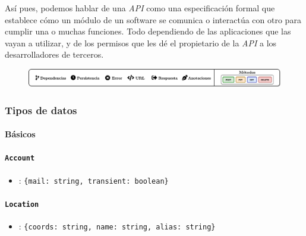 \documentclass[../ei103948-project-documentation.tex]{subfiles}
\begin{document}
Así pues, podemos hablar de una \textit{API} como una especificación formal que establece cómo un módulo de un software se comunica o interactúa con otro para cumplir una o muchas funciones. Todo dependiendo de las aplicaciones que las vayan a utilizar, y de los permisos que les dé el propietario de la \textit{API} a los desarrolladores de terceros.\\

\begin{figure}[H]
    \begin{center}
    \includegraphics[scale=0.083]{images/BannerAPI.png}
    \end{center}
\end{figure}


        \subsubsection{Tipos de datos}
            \paragraph{Básicos}
                \paragraph*{\texttt{Account}}
                    \begin{itemize}
                        \item [\faIcon{sign-out-alt}] : \texttt{\{mail: string, transient: boolean\}}
                    \end{itemize}
                \paragraph*{\texttt{Location}}
                    \begin{itemize}
                        \item [\faIcon{sign-out-alt}] : \texttt{\{coords: string, name: string, alias: string\}}
                    \end{itemize}
\end{document}
